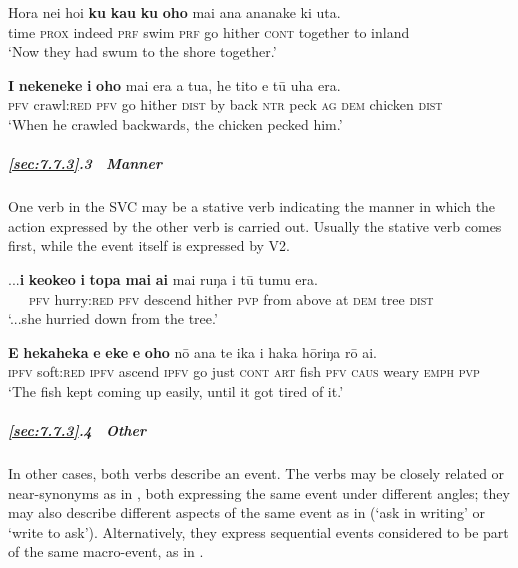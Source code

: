 \ea\label{ex:7.186}
\gll Hora nei ho{\ꞌ}i \textbf{ku} \textbf{kau} \textbf{ku} \textbf{oho} mai {\ꞌ}ana ananake ki {\ꞌ}uta. \\
time \textsc{prox} indeed \textsc{prf} swim \textsc{prf} go hither \textsc{cont} together to inland \\

\glt 
‘Now they had swum to the shore together.’ \textstyleExampleref{[R361.032]} 
\z

\ea\label{ex:7.187}
\gll \textbf{I} \textbf{nekeneke} \textbf{i} \textbf{oho} mai era a tu{\ꞌ}a, he tito e tū {\ꞌ}uha era. \\
\textsc{pfv} crawl:\textsc{red} \textsc{pfv} go hither \textsc{dist} by back \textsc{ntr} peck \textsc{ag} \textsc{dem} chicken \textsc{dist} \\

\glt 
‘When he crawled backwards, the chicken pecked him.’ \textstyleExampleref{[R250.160]} 
\z

\subparagraph{\ref{sec:7.7.3}.3~ Manner} One verb in the SVC may be a stative verb indicating the manner in which the action expressed by the other verb is carried out. Usually the stative verb comes first, while the event itself is expressed by V2. 

\ea\label{ex:7.188}
\gll ...\textbf{i} \textbf{ke{\ꞌ}oke{\ꞌ}o} \textbf{i} \textbf{topa} \textbf{mai} \textbf{ai} mai ruŋa i tū tumu era. \\
~~~\textsc{pfv} hurry:\textsc{red} \textsc{pfv} descend hither \textsc{pvp} from above at \textsc{dem} tree \textsc{dist} \\

\glt 
‘...she hurried down from the tree.’ \textstyleExampleref{[R496.045]} 
\z

\ea\label{ex:7.189}
\gll \textbf{E} \textbf{hekaheka} \textbf{e} \textbf{eke} \textbf{e} \textbf{oho} nō {\ꞌ}ana te ika i haka hōriŋa rō ai. \\
\textsc{ipfv} soft:\textsc{red} \textsc{ipfv} ascend \textsc{ipfv} go just \textsc{cont} \textsc{art} fish \textsc{pfv} \textsc{caus} weary \textsc{emph} \textsc{pvp} \\

\glt 
‘The fish kept coming up easily, until it got tired of it.’ \textstyleExampleref{[R361.053]} 
\z

\subparagraph{\ref{sec:7.7.3}.4~ Other} In other cases, both verbs describe an event. The verbs may be closely related or near-synonyms as in , both expressing the same event under different angles; they may also describe different aspects of the same event as in  (‘ask in writing’ or ‘write to ask’). Alternatively, they express sequential events considered to be part of the same macro-event, as in .

